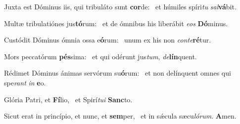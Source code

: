\item Juxta est Dóminus iis, qui tribuláto sunt \textbf{cor}de:~\psstar{} et húmiles spíri\textit{tu} \textit{sal}\textbf{vá}bit.
\item Multæ tribulatiónes jus\textbf{tó}\-rum:~\psstar{} et de ómnibus his liberábit \textit{eos} \textbf{Dó}minus.
\item Custódit Dóminus ómnia ossa e\textbf{ó}rum:~\psstar{} unum ex his non \textit{conte}\textbf{ré}tur.
\item Mors peccatórum \textbf{pés}sima:~\psstar{} et qui odérunt jus\textit{tum}, \textit{de}\textbf{lín}quent.
\item Rédimet Dóminus ánimas servórum su\textbf{ó}rum:~\psstar{} et non delínquent omnes qui spe\textit{rant} \textit{in} \textbf{e}o.
\item Glória Patri, et \textbf{Fí}lio,~\psstar{} et Spirí\textit{tui} \textbf{Sanc}to.
\item Sicut erat in princípio, et nunc, et \textbf{sem}per,~\psstar{} et in sǽcula sæcu\textit{lórum}. \textbf{A}men.
